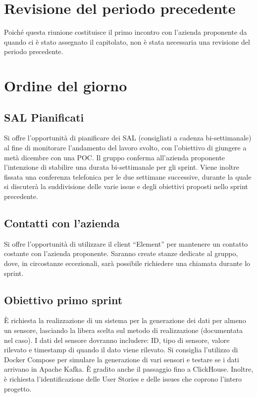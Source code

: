 \documentclass{article}
\begin{document}
\pagebreak


\maketitle
\thispagestyle{fancy}
\tableofcontents
{}
\pagebreak

\flushleft

\section{Revisione del periodo precedente}
    Poiché questa riunione costituisce il primo incontro con l'azienda proponente da quando ci è stato assegnato il capitolato, non è stata necessaria una revisione del periodo precedente.

\section{Ordine del giorno}

    \subsection{SAL Pianificati} 
        Si offre l’opportunità di pianificare dei SAL (consigliati a cadenza bi-settimanale) al fine di monitorare l’andamento del lavoro svolto, con l’obiettivo di giungere a metà dicembre con una POC. Il gruppo conferma all’azienda proponente l’intenzione 
        di stabilire una durata bi-settimanale per gli sprint. Viene inoltre fissata una conferenza telefonica per le due settimane successive, durante la quale si discuterà la suddivisione delle varie issue e degli obiettivi proposti nello sprint precedente.

    \subsection{Contatti con l'azienda} 
        Si offre l’opportunità di utilizzare il client “Element” per mantenere un contatto costante con l’azienda proponente. Saranno create stanze dedicate al gruppo, dove, in circostanze eccezionali, sarà possibile richiedere una chiamata durante lo sprint.

    \subsection{Obiettivo primo sprint}
        È richiesta la realizzazione di un sistema per la generazione dei dati per almeno un sensore, lasciando la libera scelta sul metodo di realizzazione (documentata nel caso). I dati del sensore dovranno includere: ID, tipo di sensore, valore rilevato e timestamp di quando il dato viene rilevato.
        Si consiglia l'utilizzo di Docker Compose per simulare la generazione di vari sensori e testare se i dati arrivano in Apache Kafka. È gradito anche il passaggio fino a ClickHouse.
        Inoltre, è richiesta l'identificazione delle User Stories e delle issues che coprono l'intero progetto.
\end{document}
